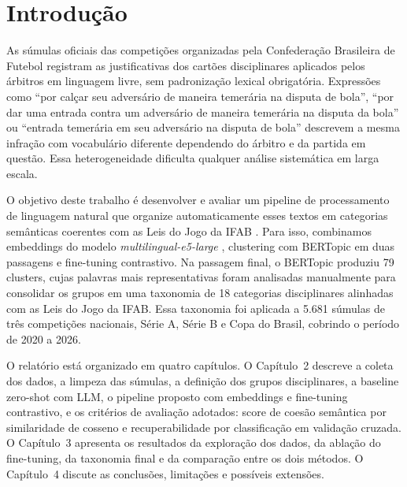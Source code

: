 \documentclass[
12pt,
openany,
oneside,
a4paper,
chapter=TITLE,
english,
french,
spanish,
brazil
]{USPSC-classe/USPSC}
\begin{document}
\frenchspacing
\raggedbottom

\imprimircapa

\textual

\chapter{Introdução}

As súmulas oficiais das competições organizadas pela Confederação Brasileira de Futebol registram as justificativas dos cartões disciplinares aplicados pelos árbitros em linguagem livre, sem padronização lexical obrigatória. Expressões como ``por calçar seu adversário de maneira temerária na disputa de bola'', ``por dar uma entrada contra um adversário de maneira temerária na disputa da bola'' ou ``entrada temerária em seu adversário na disputa de bola'' descrevem a mesma infração com vocabulário diferente dependendo do árbitro e da partida em questão. Essa heterogeneidade dificulta qualquer análise sistemática em larga escala.

O objetivo deste trabalho é desenvolver e avaliar um pipeline de processamento de linguagem natural que organize automaticamente esses textos em categorias semânticas coerentes com as Leis do Jogo da IFAB \cite{ifab2024laws}. Para isso, combinamos embeddings do modelo \textit{multilingual-e5-large} \cite{wang2022text}, clustering com BERTopic \cite{grootendorst2022bertopic} em duas passagens e fine-tuning contrastivo. Na passagem final, o BERTopic produziu 79 clusters, cujas palavras mais representativas foram analisadas manualmente para consolidar os grupos em uma taxonomia de 18 categorias disciplinares alinhadas com as Leis do Jogo da IFAB. Essa taxonomia foi aplicada a 5.681 súmulas de três competições nacionais, Série A, Série B e Copa do Brasil, cobrindo o período de 2020 a 2026.

O relatório está organizado em quatro capítulos. O Capítulo~2 descreve a coleta dos dados, a limpeza das súmulas, a definição dos grupos disciplinares, a baseline zero-shot com LLM, o pipeline proposto com embeddings e fine-tuning contrastivo, e os critérios de avaliação adotados: score de coesão semântica por similaridade de cosseno e recuperabilidade por classificação em validação cruzada. O Capítulo~3 apresenta os resultados da exploração dos dados, da ablação do fine-tuning, da taxonomia final e da comparação entre os dois métodos. O Capítulo~4 discute as conclusões, limitações e possíveis extensões.
\end{document}
